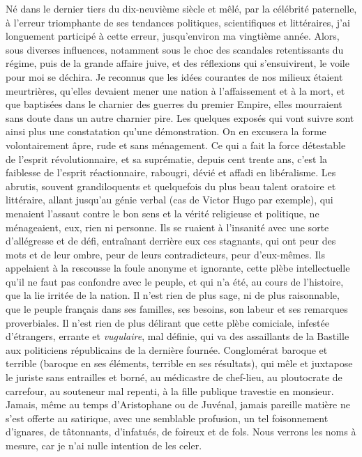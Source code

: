 \documentclass[french,twoside]{book} %
\newcommand\chaptercont{} %
\begin{document}
\chaptercont
\noindent Né dans le dernier tiers du dix-neuvième siècle et mêlé, par la célébrité paternelle, à l’erreur triomphante de ses tendances politiques, scientifiques et littéraires, j’ai longuement participé à cette erreur, jusqu’environ ma vingtième année. Alors, sous diverses influences, notamment sous le choc des scandales retentissants du régime, puis de la grande affaire juive, et des réflexions qui s’ensuivirent, le voile pour moi se déchira. Je reconnus que les idées courantes de nos milieux étaient meurtrières, qu’elles devaient mener une nation à l’affaissement et à la mort, et que baptisées dans le charnier des guerres du premier Empire, elles mourraient sans doute dans un autre charnier pire. Les quelques exposés qui vont suivre sont ainsi plus une constatation qu’une démonstration. On en excusera la forme volontairement âpre, rude et sans ménagement. Ce qui a fait la force détestable de l’esprit révolutionnaire, et sa suprématie, depuis cent trente ans, c’est la faiblesse de l’esprit réactionnaire, rabougri, dévié et affadi en libéralisme. Les abrutis, souvent grandiloquents et quelquefois du plus beau talent oratoire et littéraire, allant jusqu’au génie verbal (cas de Victor Hugo par exemple), qui menaient l’assaut contre le bon sens et la vérité religieuse et politique, ne ménageaient, eux, rien ni personne. Ils se ruaient à l’insanité avec une sorte d’allégresse et de défi, entraînant derrière eux ces stagnants, qui ont peur des mots et de leur ombre, peur de leurs contradicteurs, peur d’eux-mêmes. Ils appelaient à la rescousse la foule anonyme et ignorante, cette plèbe intellectuelle qu’il ne faut pas confondre avec le peuple, et qui n’a été, au cours de l’histoire, que la lie irritée de la nation. Il n’est rien de plus sage, ni de plus raisonnable, que le peuple français dans ses familles, ses besoins, son labeur et ses remarques proverbiales. Il n’est rien de plus délirant que cette plèbe comiciale, infestée d’étrangers, errante et {\itshape vugulaire}, mal définie, qui va des assaillants de la Bastille aux politiciens républicains de la dernière fournée. Conglomérat baroque et terrible (baroque en ses éléments, terrible en ses résultats), qui mêle et juxtapose le juriste sans entrailles et borné, au médicastre de chef-lieu, au ploutocrate de carrefour, au souteneur mal repenti, à la fille publique travestie en monsieur. Jamais, même au temps d’Aristophane ou de Juvénal, jamais pareille matière ne s’est offerte au satirique, avec une semblable profusion, un tel foisonnement d’ignares, de tâtonnants, d’infatués, de foireux et de fols. Nous verrons les noms à mesure, car je n’ai nulle intention de les celer.\par
\end{document}
